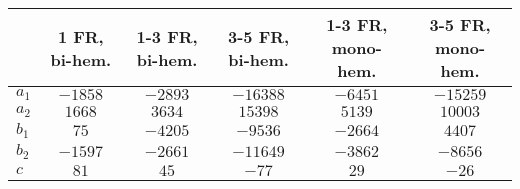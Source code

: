 \begin{tabular}{lccccc}
\hline
       & 1 FR, bi-hem. & 1-3 FR, bi-hem. & 3-5 FR, bi-hem. & 1-3 FR, mono-hem. & 3-5 FR, mono-hem. \\
\hline
 $a_1$ &          $-1858$ &            $-2893$ &           $-16388$ &              $-6451$ &             $-15259$ \\
 $a_2$ &           $1668$ &             $3634$ &            $15398$ &               $5139$ &              $10003$ \\
 $b_1$ &             $75$ &            $-4205$ &            $-9536$ &              $-2664$ &               $4407$ \\
 $b_2$ &          $-1597$ &            $-2661$ &           $-11649$ &              $-3862$ &              $-8656$ \\
   $c$ &             $81$ &               $45$ &              $-77$ &                 $29$ &                $-26$ \\
\hline
\end{tabular}
